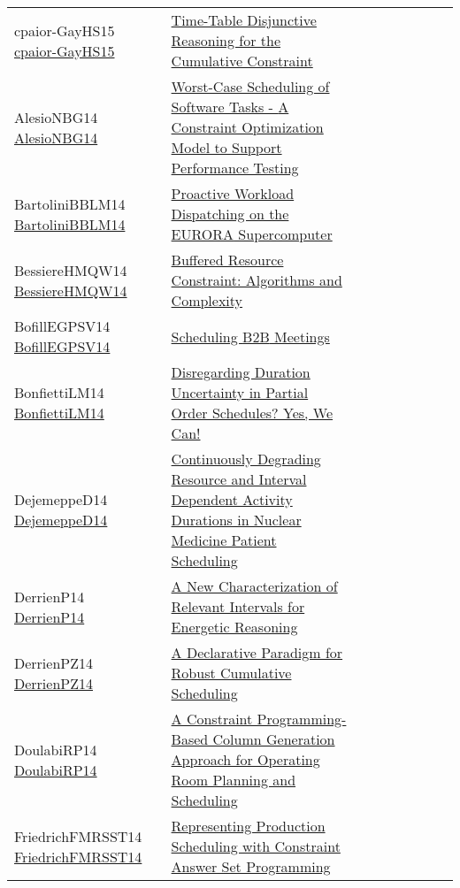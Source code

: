 {\begin{longtable}{p{3cm}p{7cm}lllllll}
cpaior-GayHS15 \href{https://doi.org/10.1007/978-3-319-18008-3\_11}{cpaior-GayHS15} &  \href{papers/cpaior-GayHS15.pdf}{Time-Table Disjunctive Reasoning for the Cumulative Constraint} &  &  &  &  &  &  & \\
AlesioNBG14 \href{https://doi.org/10.1007/978-3-319-10428-7\_58}{AlesioNBG14} &  \href{papers/AlesioNBG14.pdf}{Worst-Case Scheduling of Software Tasks - {A} Constraint Optimization Model to Support Performance Testing} &  &  &  &  &  &  & \\
BartoliniBBLM14 \href{https://doi.org/10.1007/978-3-319-10428-7\_55}{BartoliniBBLM14} &  \href{papers/BartoliniBBLM14.pdf}{Proactive Workload Dispatching on the {EURORA} Supercomputer} &  &  &  &  &  &  & \\
BessiereHMQW14 \href{https://doi.org/10.1007/978-3-319-07046-9\_23}{BessiereHMQW14} &  \href{papers/BessiereHMQW14.pdf}{Buffered Resource Constraint: Algorithms and Complexity} &  &  &  &  &  &  & \\
BofillEGPSV14 \href{https://doi.org/10.1007/978-3-319-10428-7\_56}{BofillEGPSV14} &  \href{papers/BofillEGPSV14.pdf}{Scheduling {B2B} Meetings} &  &  &  &  &  &  & \\
BonfiettiLM14 \href{https://doi.org/10.1007/978-3-319-07046-9\_15}{BonfiettiLM14} &  \href{papers/BonfiettiLM14.pdf}{Disregarding Duration Uncertainty in Partial Order Schedules? Yes, We Can!} &  &  &  &  &  &  & \\
DejemeppeD14 \href{https://doi.org/10.1007/978-3-319-07046-9\_20}{DejemeppeD14} &  \href{papers/DejemeppeD14.pdf}{Continuously Degrading Resource and Interval Dependent Activity Durations in Nuclear Medicine Patient Scheduling} &  &  &  &  &  &  & \\
DerrienP14 \href{https://doi.org/10.1007/978-3-319-10428-7\_22}{DerrienP14} &  \href{papers/DerrienP14.pdf}{A New Characterization of Relevant Intervals for Energetic Reasoning} &  &  &  &  &  &  & \\
DerrienPZ14 \href{https://doi.org/10.1007/978-3-319-10428-7\_23}{DerrienPZ14} &  \href{papers/DerrienPZ14.pdf}{A Declarative Paradigm for Robust Cumulative Scheduling} &  &  &  &  &  &  & \\
DoulabiRP14 \href{https://doi.org/10.1007/978-3-319-07046-9\_32}{DoulabiRP14} &  \href{papers/DoulabiRP14.pdf}{A Constraint Programming-Based Column Generation Approach for Operating Room Planning and Scheduling} &  &  &  &  &  &  & \\
FriedrichFMRSST14 \href{https://doi.org/10.1007/978-3-319-28697-6\_23}{FriedrichFMRSST14} &  \href{}{Representing Production Scheduling with Constraint Answer Set Programming} &  &  &  &  &  &  & \\

\end{longtable}}
